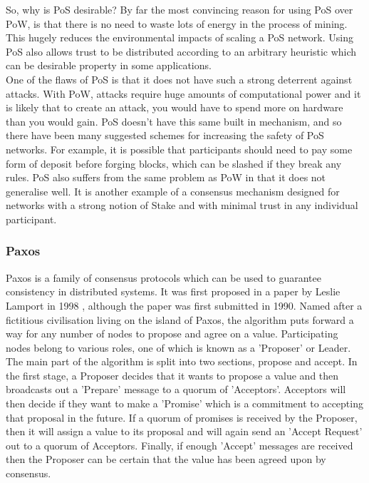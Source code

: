 \documentclass[12pt,a4paper,twoside,openright]{report}
\begin{document}
			So, why is PoS desirable? 
			By far the most convincing reason for using PoS over PoW, is that there is no need to waste lots of energy in the process of mining. 
			This hugely reduces the environmental impacts of scaling a PoS network.
			Using PoS also allows trust to be distributed according to an arbitrary heuristic which can be desirable property in some applications.\\

			One of the flaws of PoS is that it does not have such a strong deterrent against attacks.
			With PoW, attacks require huge amounts of computational power and it is likely that to create an attack, you would have to spend more on hardware than you would gain. 
			PoS doesn't have this same built in mechanism, and so there have been many suggested schemes for increasing the safety of PoS networks.
			For example, it is possible that participants should need to pay some form of deposit before forging blocks, which can be slashed if they break any rules. 
			PoS also suffers from the same problem as PoW in that it does not generalise well. 
			It is another example of a consensus mechanism designed for networks with a strong notion of Stake and with minimal trust in any individual participant.

			\subsubsection*{Paxos}
			Paxos is a family of consensus protocols which can be used to guarantee consistency in distributed systems. 
			It was first proposed in a paper by Leslie Lamport in 1998 \cite{Paxos}, although the paper was first submitted in 1990.
			Named after a fictitious civilisation living on the island of Paxos, the algorithm puts forward a way for any number of nodes to propose and agree on a value.
			Participating nodes belong to various roles, one of which is known as a 'Proposer' or Leader.\\

			The main part of the algorithm is split into two sections, propose and accept.
			In the first stage, a Proposer decides that it wants to propose a value and then broadcasts out a 'Prepare' message to a quorum of 'Acceptors'.
			Acceptors will then decide if they want to make a 'Promise' which is a commitment to accepting that proposal in the future. 
			If a quorum of promises is received by the Proposer, then it will assign a value to its proposal and will again send an 'Accept Request' out to a quorum of Acceptors.
			Finally, if enough 'Accept' messages are received then the Proposer can be certain that the value has been agreed upon by consensus.\\
\end{document}
